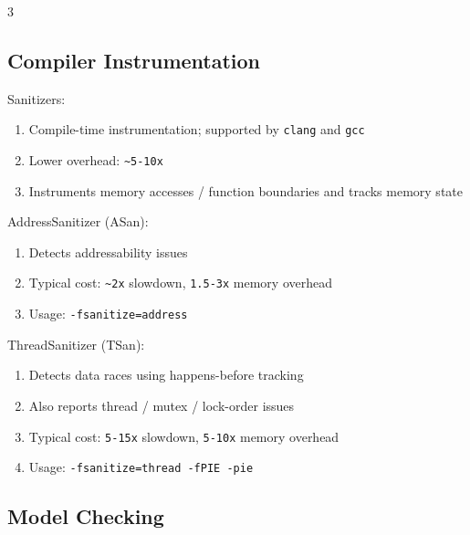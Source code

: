 \documentclass[12pt, a4paper]{article}
\begin{document}
\begin{multicols*}{3}
\subsection{Compiler Instrumentation}

Sanitizers:
\begin{enumerate}[\roman*.]
  \item Compile-time instrumentation; supported by \lstinline|clang| and \lstinline|gcc|
  \item Lower overhead: \lstinline|~5-10x|
  \item Instruments memory accesses / function boundaries and tracks memory state
\end{enumerate}

AddressSanitizer (ASan):
\begin{enumerate}[\roman*.]
  \item Detects addressability issues
  \item Typical cost: \lstinline|~2x| slowdown, \lstinline|1.5-3x| memory overhead
  \item Usage: \lstinline|-fsanitize=address|
\end{enumerate}

ThreadSanitizer (TSan):
\begin{enumerate}[\roman*.]
  \item Detects data races using happens-before tracking
  \item Also reports thread / mutex / lock-order issues
  \item Typical cost: \lstinline|5-15x| slowdown, \lstinline|5-10x| memory overhead
  \item Usage: \lstinline|-fsanitize=thread -fPIE -pie|
\end{enumerate}

\colbreak
\subsection{Model Checking}


\end{multicols*}
\end{document}
